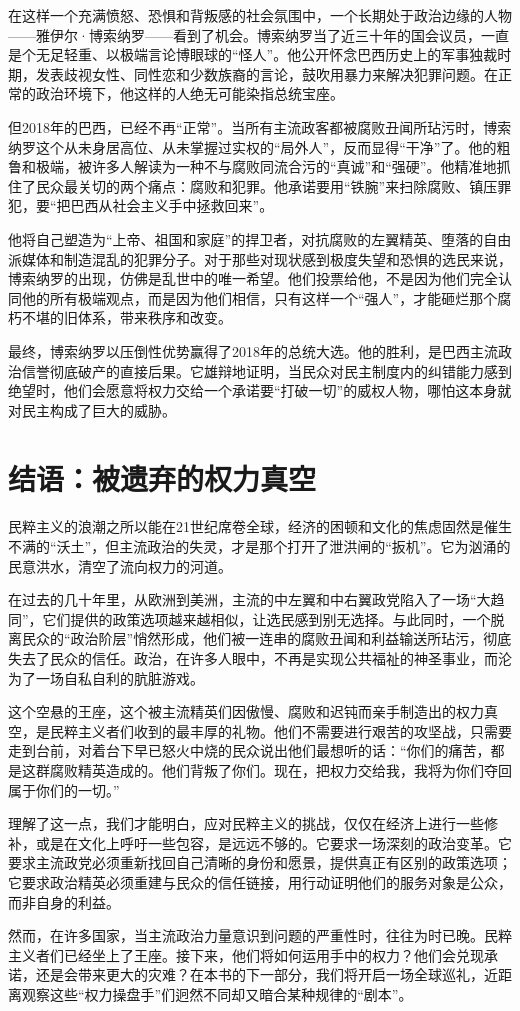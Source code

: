 在这样一个充满愤怒、恐惧和背叛感的社会氛围中，一个长期处于政治边缘的人物——雅伊尔·博索纳罗——看到了机会。博索纳罗当了近三十年的国会议员，一直是个无足轻重、以极端言论博眼球的“怪人”。他公开怀念巴西历史上的军事独裁时期，发表歧视女性、同性恋和少数族裔的言论，鼓吹用暴力来解决犯罪问题。在正常的政治环境下，他这样的人绝无可能染指总统宝座。

但2018年的巴西，已经不再“正常”。当所有主流政客都被腐败丑闻所玷污时，博索纳罗这个从未身居高位、从未掌握过实权的“局外人”，反而显得“干净”了。他的粗鲁和极端，被许多人解读为一种不与腐败同流合污的“真诚”和“强硬”。他精准地抓住了民众最关切的两个痛点：腐败和犯罪。他承诺要用“铁腕”来扫除腐败、镇压罪犯，要“把巴西从社会主义手中拯救回来”。

他将自己塑造为“上帝、祖国和家庭”的捍卫者，对抗腐败的左翼精英、堕落的自由派媒体和制造混乱的犯罪分子。对于那些对现状感到极度失望和恐惧的选民来说，博索纳罗的出现，仿佛是乱世中的唯一希望。他们投票给他，不是因为他们完全认同他的所有极端观点，而是因为他们相信，只有这样一个“强人”，才能砸烂那个腐朽不堪的旧体系，带来秩序和改变。

最终，博索纳罗以压倒性优势赢得了2018年的总统大选。他的胜利，是巴西主流政治信誉彻底破产的直接后果。它雄辩地证明，当民众对民主制度内的纠错能力感到绝望时，他们会愿意将权力交给一个承诺要“打破一切”的威权人物，哪怕这本身就对民主构成了巨大的威胁。

\section{结语：被遗弃的权力真空}

民粹主义的浪潮之所以能在21世纪席卷全球，经济的困顿和文化的焦虑固然是催生不满的“沃土”，但主流政治的失灵，才是那个打开了泄洪闸的“扳机”。它为汹涌的民意洪水，清空了流向权力的河道。

在过去的几十年里，从欧洲到美洲，主流的中左翼和中右翼政党陷入了一场“大趋同”，它们提供的政策选项越来越相似，让选民感到别无选择。与此同时，一个脱离民众的“政治阶层”悄然形成，他们被一连串的腐败丑闻和利益输送所玷污，彻底失去了民众的信任。政治，在许多人眼中，不再是实现公共福祉的神圣事业，而沦为了一场自私自利的肮脏游戏。

这个空悬的王座，这个被主流精英们因傲慢、腐败和迟钝而亲手制造出的权力真空，是民粹主义者们收到的最丰厚的礼物。他们不需要进行艰苦的攻坚战，只需要走到台前，对着台下早已怒火中烧的民众说出他们最想听的话：“你们的痛苦，都是这群腐败精英造成的。他们背叛了你们。现在，把权力交给我，我将为你们夺回属于你们的一切。”

理解了这一点，我们才能明白，应对民粹主义的挑战，仅仅在经济上进行一些修补，或是在文化上呼吁一些包容，是远远不够的。它要求一场深刻的政治变革。它要求主流政党必须重新找回自己清晰的身份和愿景，提供真正有区别的政策选项；它要求政治精英必须重建与民众的信任链接，用行动证明他们的服务对象是公众，而非自身的利益。

然而，在许多国家，当主流政治力量意识到问题的严重性时，往往为时已晚。民粹主义者们已经坐上了王座。接下来，他们将如何运用手中的权力？他们会兑现承诺，还是会带来更大的灾难？在本书的下一部分，我们将开启一场全球巡礼，近距离观察这些“权力操盘手”们迥然不同却又暗合某种规律的“剧本”。